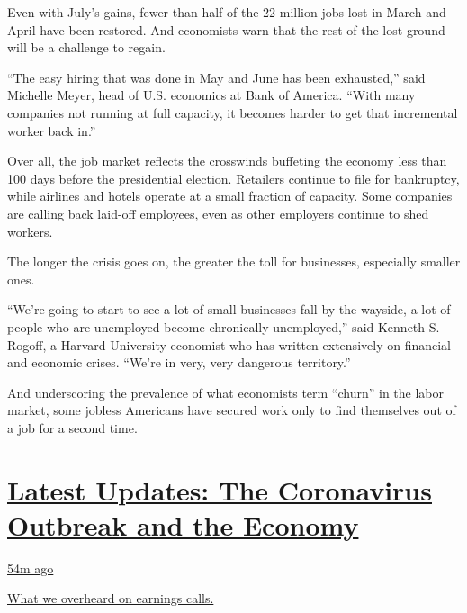 Even with July's gains, fewer than half of the 22 million jobs lost in
March and April have been restored. And economists warn that the rest of
the lost ground will be a challenge to regain.

``The easy hiring that was done in May and June has been exhausted,''
said Michelle Meyer, head of U.S. economics at Bank of America. ``With
many companies not running at full capacity, it becomes harder to get
that incremental worker back in.''

Over all, the job market reflects the crosswinds buffeting the economy
less than 100 days before the presidential election. Retailers continue
to file for bankruptcy, while airlines and hotels operate at a small
fraction of capacity. Some companies are calling back laid-off
employees, even as other employers continue to shed workers.

The longer the crisis goes on, the greater the toll for businesses,
especially smaller ones.

``We're going to start to see a lot of small businesses fall by the
wayside, a lot of people who are unemployed become chronically
unemployed,'' said Kenneth S. Rogoff, a Harvard University economist who
has written extensively on financial and economic crises. ``We're in
very, very dangerous territory.''

And underscoring the prevalence of what economists term ``churn'' in the
labor market, some jobless Americans have secured work only to find
themselves out of a job for a second time.

\hypertarget{latest-updates-the-coronavirus-outbreak-and-the-economy}{%
\section{\texorpdfstring{\href{https://www.nytimes3xbfgragh.onion/live/2020/08/21/business/stock-market-today-coronavirus?action=click\&pgtype=Article\&state=default\&region=MAIN_CONTENT_1\&context=storylines_live_updates}{Latest
Updates: The Coronavirus Outbreak and the
Economy}}{Latest Updates: The Coronavirus Outbreak and the Economy}}\label{latest-updates-the-coronavirus-outbreak-and-the-economy}}

\href{https://www.nytimes3xbfgragh.onion/live/2020/08/21/business/stock-market-today-coronavirus?action=click\&pgtype=Article\&state=default\&region=MAIN_CONTENT_1\&context=storylines_live_updates\#what-we-overheard-on-earnings-calls}{54m
ago}

\href{https://www.nytimes3xbfgragh.onion/live/2020/08/21/business/stock-market-today-coronavirus?action=click\&pgtype=Article\&state=default\&region=MAIN_CONTENT_1\&context=storylines_live_updates\#what-we-overheard-on-earnings-calls}{What
we overheard on earnings calls.}

